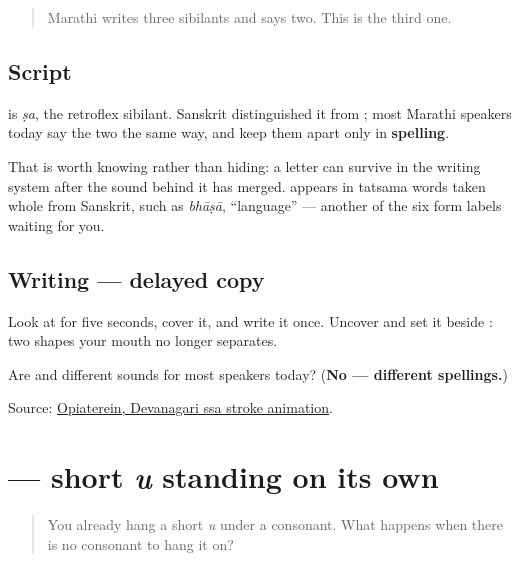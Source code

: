 \begin{quote}
Marathi writes three sibilants and says two. This is the third one.
\end{quote}

\subsection*{Script}
\begin{quote}
\end{quote}

\textbf{} is \emph{ṣa}, the retroflex sibilant. Sanskrit distinguished it from \textbf{}; most Marathi speakers today say the two the same way, and keep them apart only in \textbf{spelling}.

That is worth knowing rather than hiding: a letter can survive in the writing system after the sound behind it has merged. \textbf{} appears in tatsama words taken whole from Sanskrit, such as \emph{bhāṣā}, \textquotedblleft{}language\textquotedblright{} — another of the six form labels waiting for you.

\subsection*{Writing — delayed copy}

Look at \textbf{} for five seconds, cover it, and write it once. Uncover and set it beside \textbf{}: two shapes your mouth no longer separates.

\begin{tcolorbox}[breakable,colback=teal!4,colframe=teal!35!black,title={Before you move on}]
Are \textbf{} and \textbf{} different sounds for most speakers today? (\textbf{No — different spellings.})

Source: \href{https://commons.wikimedia.org/wiki/File:Deva-\%E0\%A4\%B7-order.gif}{Opiaterein, Devanagari ssa stroke animation}.
\end{tcolorbox}
\section[\texorpdfstring{\mr{उ} (u)}{उ (u)}]{ — short \emph{u} standing on its own}

\label{lesson:MR-W08-u-independent}



\begin{quote}
You already hang a short \emph{u} under a consonant. What happens when there is no consonant to hang it on?
\end{quote}

